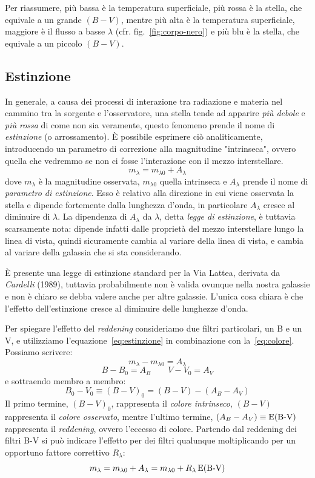 Per riassumere, più bassa è la temperatura superficiale, più rossa è la stella, che equivale a un grande $(B-V)$, mentre più alta è la temperatura superficiale, maggiore è il flusso a basse $\lambda$ (cfr. fig.~\ref{fig:corpo-nero}) e più blu è la stella, che equivale a un piccolo $(B-V)$.

\subsection{Estinzione}\label{sec:reddening}
In generale, a causa dei processi di interazione tra radiazione e materia nel cammino tra la sorgente e l'osservatore, una stella tende ad apparire \emph{più debole} e \emph{più rossa} di come non sia veramente, questo fenomeno prende il nome di \emph{estinzione} (o arrossamento). È possibile esprimere ciò analiticamente, introducendo un parametro di correzione alla magnitudine "intrinseca", ovvero quella che vedremmo se non ci fosse l'interazione con il mezzo interstellare.
\begin{equation}\label{eq:estinzione}
    m_\lambda = m_{\lambda 0} + A_\lambda
\end{equation}
dove $m_\lambda$ è la magnitudine osservata, $m_{\lambda 0}$ quella intrinseca e $A_\lambda$ prende il nome di \emph{parametro di estinzione}. Esso è relativo alla direzione in cui viene osservata la stella e dipende fortemente dalla lunghezza d'onda, in particolare $A_\lambda$ cresce al diminuire di $\lambda$. La dipendenza di $A_\lambda$ da $\lambda$, detta \emph{legge di estinzione}, è tuttavia scarsamente nota: dipende infatti dalle proprietà del mezzo interstellare lungo la linea di vista, quindi sicuramente cambia al variare della linea di vista, e cambia al variare della galassia che si sta considerando.

È presente una legge di estinzione standard per la Via Lattea, derivata da \emph{Cardelli} (1989), tuttavia probabilmente non è valida ovunque nella nostra galassie e non è chiaro se debba valere anche per altre galassie. L'unica cosa chiara è che l'effetto dell'estinzione cresce al diminuire delle lunghezze d'onda.

Per spiegare l'effetto del \emph{reddening} consideriamo due filtri particolari, un B e un V, e utilizziamo l'equazione~\eqref{eq:estinzione} in combinazione con la~\eqref{eq:colore}. Possiamo scrivere:
\[
    m_\lambda - m_{\lambda 0} = A_\lambda
\]
\[
    B - B_0 = A_B \qquad V - V_0 = A_V
\]
e sottraendo membro a membro:
\[
    B_0 - V_0 \equiv (B-V)_0 = (B-V) - (A_B - A_V)
\]
Il primo termine, $(B-V)_0$, rappresenta il \emph{colore intrinseco}, $(B-V)$ rappresenta il \emph{colore osservato}, mentre l'ultimo termine, $(A_B-A_V) \equiv \operatorname{E(B-V)}$ rappresenta il \emph{reddening}, ovvero l'eccesso di colore. Partendo dal reddening dei filtri B-V si può indicare l'effetto per dei filtri qualunque moltiplicando per un opportuno fattore correttivo $R_\lambda$:
\begin{equation}\label{eq:reddening}
    m_\lambda = m_{\lambda 0} + A_\lambda = m_{\lambda 0} + R_\lambda \operatorname{E(B-V)}
\end{equation}


